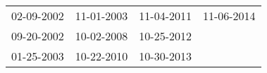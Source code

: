 \begin{supertabular}{llll}
 02-09-2002 &  11-01-2003 &  11-04-2011 &  11-06-2014 \\
 09-20-2002 &  10-02-2008 &  10-25-2012 &             \\
 01-25-2003 &  10-22-2010 &  10-30-2013 &             \\
\end{supertabular}
